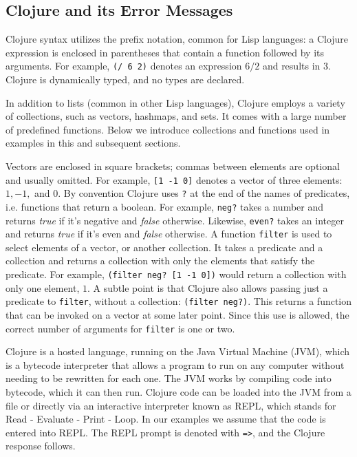 \documentclass[12pt]{article}
\newcommand{\comment}[1]{}
\newcommand{\emcomment}[1]{\textcolor{ForestGreen}{\comment{Elena: {#1}}}}
\begin{document}
\subsection{Clojure and its Error Messages}\label{subsec:clojure-errs}
Clojure syntax utilizes the prefix notation, common for Lisp languages: a Clojure expression is enclosed in parentheses that contain a function followed by its arguments. 
For example, \texttt{(/ 6 2)} denotes an expression $6 / 2$ and results in $3$. Clojure is dynamically typed, and no types are declared. 

In addition to lists (common in other Lisp languages), Clojure employs a variety of collections, such as vectors, hashmaps, and sets. 
It comes with a large number of predefined functions. Below we introduce collections and functions used in examples in this and subsequent sections. 
 
Vectors are enclosed in square brackets; commas between elements are optional and usually omitted. 
For example,  \texttt{[1 -1 0]} denotes a vector of three elements: $1, -1,$ and $0$. 
By convention Clojure uses \texttt{?} at the end of the names of predicates, i.e. functions that return a boolean. 
For example, \texttt{neg?} takes a number and returns \textit{true} if it's negative and \textit{false} otherwise.
Likewise, \texttt{even?} takes an integer and returns \textit{true} if it's even and \textit{false} otherwise.
A function \texttt{filter} is used to select elements of a vector, or another collection. 
It takes a predicate and  a collection and returns a collection with only the elements that satisfy the predicate. 
For example, \texttt{(filter neg? [1 -1 0])} would return a collection with only one element, $1$. 
A subtle point is that Clojure also allows passing just a predicate to \texttt{filter}, without a collection:  \texttt{(filter neg?)}. This returns a function that can be invoked on a vector at some later point. 
Since this use is allowed, the correct number of arguments for \texttt{filter} is one or two. 

	Clojure is a hosted language, running on the Java Virtual Machine (JVM), which is a bytecode interpreter that allows a program to run on any computer without needing to be rewritten for each one. 
	The JVM works by compiling code into bytecode, which it can then run. 
Clojure code can be loaded into the JVM from a file or directly via an interactive interpreter known as REPL, which stands for Read - Evaluate - Print - Loop. In our examples we assume that the code is entered into REPL. 
The REPL prompt is denoted with \texttt{=>}, and the Clojure response follows. 
\end{document}
